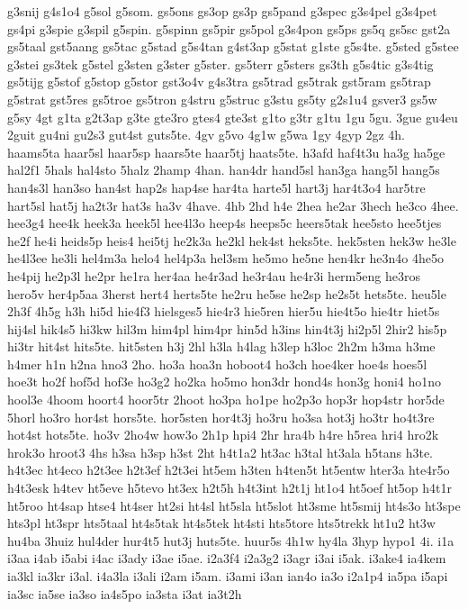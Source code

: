 {g3snij
g4s1o4
g5sol
g5som.
gs5ons
gs3op
gs3p
gs5pand
g3spec
g3s4pel
g3s4pet
gs4pi
g3spie
g3spil
g5spin.
g5spinn
gs5pir
gs5pol
g3s4pon
gs5ps
gs5q
gs5sc
gst2a
gs5taal
gst5aang
gs5tac
g5stad
g5s4tan
g4st3ap
g5stat
g1ste
g5s4te.
g5sted
g5stee
g3stei
gs3tek
g5stel
g3sten
g3ster
g5ster.
gs5terr
g5sters
gs3th
g5s4tic
g3s4tig
gs5tijg
g5stof
g5stop
g5stor
gst3o4v
g4s3tra
gs5trad
gs5trak
gst5ram
gs5trap
g5strat
gst5res
gs5troe
gs5tron
g4stru
g5struc
g3stu
gs5ty
g2s1u4
gsver3
gs5w
g5sy
4gt
g1ta
g2t3ap
g3te
gte3ro
gtes4
gte3st
g1to
g3tr
g1tu
1gu
5gu.
3gue
gu4eu
2guit
gu4ni
gu2s3
gut4st
guts5te.
4gv
g5vo
4g1w
g5wa
1gy
4gyp
2gz
4h.
haams5ta
haar5sl
haar5sp
haars5te
haar5tj
haats5te.
h3afd
haf4t3u
ha3g
ha5ge
hal2f1
5hals
hal4sto
5halz
2hamp
4han.
han4dr
hand5sl
han3ga
hang5l
hang5s
han4s3l
han3so
han4st
hap2s
hap4se
har4ta
harte5l
hart3j
har4t3o4
har5tre
hart5sl
hat5j
ha2t3r
hat3s
ha3v
4have.
4hb
2hd
h4e
2hea
he2ar
3hech
he3co
4hee.
hee3g4
hee4k
heek3a
heek5l
hee4l3o
heep4s
heeps5c
heers5tak
hee5sto
hee5tjes
he2f
he4i
heids5p
heis4
hei5tj
he2k3a
he2kl
hek4st
heks5te.
hek5sten
hek3w
he3le
he4l3ee
he3li
hel4m3a
helo4
hel4p3a
hel3sm
he5mo
he5ne
hen4kr
he3n4o
4he5o
he4pij
he2p3l
he2pr
he1ra
her4aa
he4r3ad
he3r4au
he4r3i
herm5eng
he3ros
hero5v
her4p5aa
3herst
hert4
herts5te
he2ru
he5se
he2sp
he2s5t
hets5te.
heu5le
2h3f
4h5g
h3h
hi5d
hie4f3
hielsges5
hie4r3
hie5ren
hier5u
hie4t5o
hie4tr
hiet5s
hij4sl
hik4s5
hi3kw
hil3m
him4pl
him4pr
hin5d
h3ins
hin4t3j
hi2p5l
2hir2
his5p
hi3tr
hit4st
hits5te.
hit5sten
h3j
2hl
h3la
h4lag
h3lep
h3loc
2h2m
h3ma
h3me
h4mer
h1n
h2na
hno3
2ho.
ho3a
hoa3n
hoboot4
ho3ch
hoe4ker
hoe4s
hoes5l
hoe3t
ho2f
hof5d
hof3e
ho3g2
ho2ka
ho5mo
hon3dr
hond4s
hon3g
honi4
ho1no
hool3e
4hoom
hoort4
hoor5tr
2hoot
ho3pa
ho1pe
ho2p3o
hop3r
hop4str
hor5de
5horl
ho3ro
hor4st
hors5te.
hor5sten
hor4t3j
ho3ru
ho3sa
hot3j
ho3tr
ho4t3re
hot4st
hots5te.
ho3v
2ho4w
how3o
2h1p
hpi4
2hr
hra4b
h4re
h5rea
hri4
hro2k
hrok3o
hroot3
4hs
h3sa
h3sp
h3st
2ht
h4t1a2
ht3ac
h3tal
ht3ala
h5tans
h3te.
h4t3ec
ht4eco
h2t3ee
h2t3ef
h2t3ei
ht5em
h3ten
h4ten5t
ht5entw
hter3a
hte4r5o
h4t3esk
h4tev
ht5eve
h5tevo
ht3ex
h2t5h
h4t3int
h2t1j
ht1o4
ht5oef
ht5op
h4t1r
ht5roo
ht4sap
htse4
ht4ser
ht2si
ht4sl
ht5sla
ht5slot
ht3sme
ht5smij
ht4s3o
ht3spe
hts3pl
ht3spr
hts5taal
ht4s5tak
ht4s5tek
ht4sti
hts5tore
hts5trekk
ht1u2
ht3w
hu4ba
3huiz
hul4der
hur4t5
hut3j
huts5te.
huur5s
4h1w
hy4la
3hyp
hypo1
4i.
i1a
i3aa
i4ab
i5abi
i4ac
i3ady
i3ae
i5ae.
i2a3f4
i2a3g2
i3agr
i3ai
i5ak.
i3ake4
ia4kem
ia3kl
ia3kr
i3al.
i4a3la
i3ali
i2am
i5am.
i3ami
i3an
ian4o
ia3o
i2a1p4
ia5pa
i5api
ia3sc
ia5se
ia3so
ia4s5po
ia3sta
i3at
ia3t2h
}
